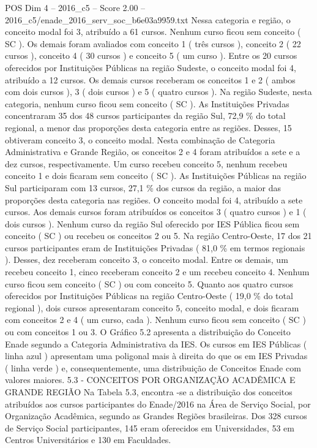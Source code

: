 \begin{textsample}{POS Dim 4 – 2016\_c5 – Score 2.00 – 2016\_c5/enade\_2016\_serv\_soc\_b6e03a9959.txt}
Nessa categoria e região, o conceito modal foi 3, atribuído a 61 cursos.
Nenhum curso ficou sem conceito ( SC ).
Os demais foram avaliados com conceito 1 ( três cursos ), conceito 2 ( 22 cursos ), conceito 4 ( 30 cursos ) e conceito 5 ( um curso ).
Entre os 20 cursos oferecidos por Instituições Públicas na região Sudeste, o conceito modal foi 4, atribuído a 12 cursos.
Os demais cursos receberam os conceitos 1 e 2 ( ambos com dois cursos ), 3 ( dois cursos ) e 5 ( quatro cursos ).
Na região Sudeste, nesta categoria, nenhum curso ficou sem conceito ( SC ).
As Instituições Privadas concentraram 35 dos 48 cursos participantes da região Sul, 72,9 \% do total regional, a menor das proporções desta categoria entre as regiões.
Desses, 15 obtiveram conceito 3, o conceito modal.
Nesta combinação de Categoria Administrativa e Grande Região, os conceitos 2 e 4 foram atribuídos a sete e a dez cursos, respectivamente.
Um curso recebeu conceito 5, nenhum recebeu conceito 1 e dois ficaram sem conceito ( SC ).
As Instituições Públicas na região Sul participaram com 13 cursos, 27,1 \% dos cursos da região, a maior das proporções desta categoria nas regiões.
O conceito modal foi 4, atribuído a sete cursos.
Aos demais cursos foram atribuídos os conceitos 3 ( quatro cursos ) e 1 ( dois cursos ).
Nenhum curso da região Sul oferecido por IES Pública ficou sem conceito ( SC ) ou recebeu os conceitos 2 ou 5.
Na região Centro-Oeste, 17 dos 21 cursos participantes eram de Instituições Privadas ( 81,0 \% em termos regionais ).
Desses, dez receberam conceito 3, o conceito modal.
Entre os demais, um recebeu conceito 1, cinco receberam conceito 2 e um recebeu conceito 4.
Nenhum curso ficou sem conceito ( SC ) ou com conceito 5.
Quanto aos quatro cursos oferecidos por Instituições Públicas na região Centro-Oeste ( 19,0 \% do total regional ), dois cursos apresentaram conceito 5, conceito modal, e dois ficaram com conceitos 2 e 4 ( um curso, cada ).
Nenhum curso ficou sem conceito ( SC ) ou com conceitos 1 ou 3.
O Gráfico 5.2 apresenta a distribuição do Conceito Enade segundo a Categoria Administrativa da IES.
Os cursos em IES Públicas ( linha azul ) apresentam uma poligonal mais à direita do que os em IES Privadas ( linha verde ) e, consequentemente, uma distribuição de Conceitos Enade com valores maiores. 5.3 - CONCEITOS POR ORGANIZAÇÃO ACADÊMICA E GRANDE REGIÃO Na Tabela 5.3, encontra -se a distribuição dos conceitos atribuídos aos cursos participantes do Enade/2016 na Área de Serviço Social, por Organização Acadêmica, segundo as Grandes Regiões brasileiras.
Dos 328 cursos de Serviço Social participantes, 145 eram oferecidos em Universidades, 53 em Centros Universitários e 130 em Faculdades.

\end{textsample}
